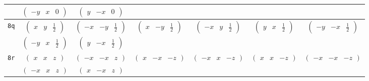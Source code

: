\documentclass[fleqn,9pt,landscape]{jsarticle}
\begin{document}
\begin{center}
\begin{longtable}{ccccccc}
& $ \begin{pmatrix} - y & x & 0 \end{pmatrix} $ & $ \begin{pmatrix} y & - x & 0 \end{pmatrix} $ & $  $ & $  $ & $  $ & $  $ \\ \hline
{\tt 8q} & $ \begin{pmatrix} x & y & \frac{1}{2} \end{pmatrix} $ & $ \begin{pmatrix} - x & - y & \frac{1}{2} \end{pmatrix} $ & $ \begin{pmatrix} x & - y & \frac{1}{2} \end{pmatrix} $ & $ \begin{pmatrix} - x & y & \frac{1}{2} \end{pmatrix} $ & $ \begin{pmatrix} y & x & \frac{1}{2} \end{pmatrix} $ & $ \begin{pmatrix} - y & - x & \frac{1}{2} \end{pmatrix} $ \\
& $ \begin{pmatrix} - y & x & \frac{1}{2} \end{pmatrix} $ & $ \begin{pmatrix} y & - x & \frac{1}{2} \end{pmatrix} $ & $  $ & $  $ & $  $ & $  $ \\ \hline
{\tt 8r} & $ \begin{pmatrix} x & x & z \end{pmatrix} $ & $ \begin{pmatrix} - x & - x & z \end{pmatrix} $ & $ \begin{pmatrix} x & - x & - z \end{pmatrix} $ & $ \begin{pmatrix} - x & x & - z \end{pmatrix} $ & $ \begin{pmatrix} x & x & - z \end{pmatrix} $ & $ \begin{pmatrix} - x & - x & - z \end{pmatrix} $ \\
& $ \begin{pmatrix} - x & x & z \end{pmatrix} $ & $ \begin{pmatrix} x & - x & z \end{pmatrix} $ & $  $ & $  $ & $  $ & $  $ \\ \hline

\end{longtable}
\end{center}
\end{document}
